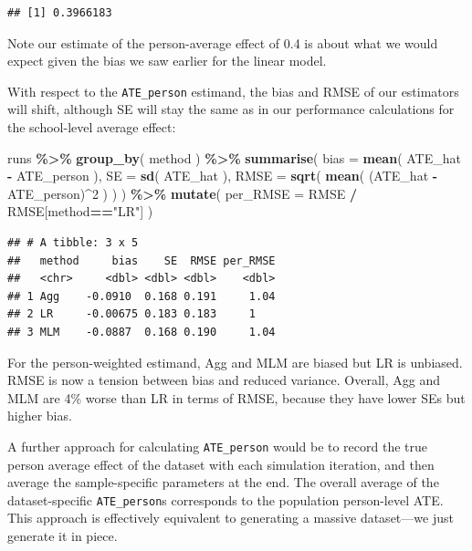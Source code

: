 \documentclass[
]{book}
\newenvironment{Shaded}{\begin{snugshade}}{\end{snugshade}}
\newcommand{\AttributeTok}[1]{\textcolor[rgb]{0.13,0.29,0.53}{#1}}
\newcommand{\DecValTok}[1]{\textcolor[rgb]{0.00,0.00,0.81}{#1}}
\newcommand{\FunctionTok}[1]{\textcolor[rgb]{0.13,0.29,0.53}{\textbf{#1}}}
\newcommand{\NormalTok}[1]{#1}
\newcommand{\SpecialCharTok}[1]{\textcolor[rgb]{0.81,0.36,0.00}{\textbf{#1}}}
\newcommand{\StringTok}[1]{\textcolor[rgb]{0.31,0.60,0.02}{#1}}
\begin{document}
\begin{verbatim}
## [1] 0.3966183
\end{verbatim}

Note our estimate of the person-average effect of 0.4 is about what we would expect given the bias we saw earlier for the linear model.

With respect to the \texttt{ATE\_person} estimand, the bias and RMSE of our estimators will shift, although SE will stay the same as in our performance calculations for the school-level average effect:

\begin{Shaded}
\begin{Highlighting}[]
\NormalTok{runs }\SpecialCharTok{\%\textgreater{}\%} 
  \FunctionTok{group\_by}\NormalTok{( method ) }\SpecialCharTok{\%\textgreater{}\%}
  \FunctionTok{summarise}\NormalTok{( }
    \AttributeTok{bias =} \FunctionTok{mean}\NormalTok{( ATE\_hat }\SpecialCharTok{{-}}\NormalTok{ ATE\_person ),}
    \AttributeTok{SE =} \FunctionTok{sd}\NormalTok{( ATE\_hat ),}
    \AttributeTok{RMSE =} \FunctionTok{sqrt}\NormalTok{( }\FunctionTok{mean}\NormalTok{( (ATE\_hat }\SpecialCharTok{{-}}\NormalTok{ ATE\_person)}\SpecialCharTok{\^{}}\DecValTok{2}\NormalTok{ ) )}
\NormalTok{  ) }\SpecialCharTok{\%\textgreater{}\%}
  \FunctionTok{mutate}\NormalTok{( }\AttributeTok{per\_RMSE =}\NormalTok{ RMSE }\SpecialCharTok{/}\NormalTok{ RMSE[method}\SpecialCharTok{==}\StringTok{"LR"}\NormalTok{] )}
\end{Highlighting}
\end{Shaded}

\begin{verbatim}
## # A tibble: 3 x 5
##   method     bias    SE  RMSE per_RMSE
##   <chr>     <dbl> <dbl> <dbl>    <dbl>
## 1 Agg    -0.0910  0.168 0.191     1.04
## 2 LR     -0.00675 0.183 0.183     1   
## 3 MLM    -0.0887  0.168 0.190     1.04
\end{verbatim}

For the person-weighted estimand, Agg and MLM are biased but LR is unbiased.
RMSE is now a tension between bias and reduced variance.
Overall, Agg and MLM are 4\% worse than LR in terms of RMSE, because they have lower SEs but higher bias.

A further approach for calculating \texttt{ATE\_person} would be to record the true person average effect of the dataset with each simulation iteration, and then average the sample-specific parameters at the end.
The overall average of the dataset-specific \texttt{ATE\_person}s corresponds to the population person-level ATE.
This approach is effectively equivalent to generating a massive dataset---we just generate it in piece.
\end{document}
